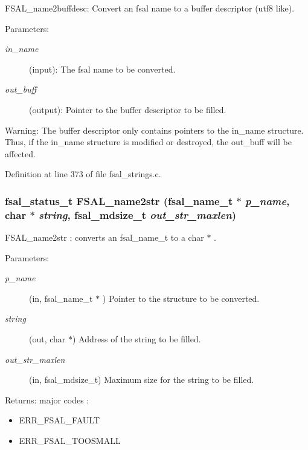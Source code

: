 FSAL\_\-name2buffdesc: Convert an fsal name to a buffer descriptor (utf8 like).

\begin{Desc}
\item[Parameters:]
\begin{description}
\item[{\em in\_\-name}](input): The fsal name to be converted. \item[{\em out\_\-buff}](output): Pointer to the buffer descriptor to be filled.\end{description}
\end{Desc}
\begin{Desc}
\item[Warning:]The buffer descriptor only contains pointers to the in\_\-name structure. Thus, if the in\_\-name structure is modified or destroyed, the out\_\-buff will be affected. \end{Desc}


Definition at line 373 of file fsal\_\-strings.c.
\subsubsection{\setlength{\rightskip}{0pt plus 5cm}fsal\_\-status\_\-t FSAL\_\-name2str (fsal\_\-name\_\-t $\ast$ {\em p\_\-name}, char $\ast$ {\em string}, fsal\_\-mdsize\_\-t {\em out\_\-str\_\-maxlen})}\label{group__FSALNameFunctions_ga2}


FSAL\_\-name2str : converts an fsal\_\-name\_\-t to a char $\ast$ .

\begin{Desc}
\item[Parameters:]
\begin{description}
\item[{\em p\_\-name}](in, fsal\_\-name\_\-t $\ast$ ) Pointer to the structure to be converted. \item[{\em string}](out, char $\ast$) Address of the string to be filled. \item[{\em out\_\-str\_\-maxlen}](in, fsal\_\-mdsize\_\-t) Maximum size for the string to be filled.\end{description}
\end{Desc}
\begin{Desc}
\item[Returns:]major codes :\begin{itemize}
\item ERR\_\-FSAL\_\-FAULT\item ERR\_\-FSAL\_\-TOOSMALL \end{itemize}
\end{Desc}


